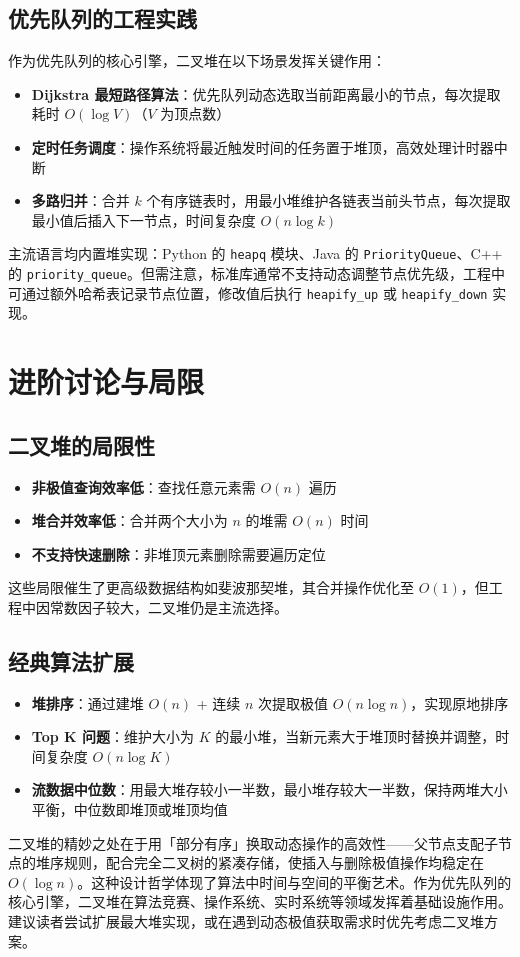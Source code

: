 \section{优先队列的工程实践}
作为优先队列的核心引擎，二叉堆在以下场景发挥关键作用：\par
\begin{itemize}
\item \textbf{Dijkstra 最短路径算法}：优先队列动态选取当前距离最小的节点，每次提取耗时 $O(\log V)$（$V$ 为顶点数）
\item \textbf{定时任务调度}：操作系统将最近触发时间的任务置于堆顶，高效处理计时器中断
\item \textbf{多路归并}：合并 $k$ 个有序链表时，用最小堆维护各链表当前头节点，每次提取最小值后插入下一节点，时间复杂度 $O(n \log k)$
\end{itemize}
主流语言均内置堆实现：Python 的 \texttt{heapq} 模块、Java 的 \texttt{PriorityQueue}、C++ 的 \texttt{priority\_{}queue}。但需注意，标准库通常不支持动态调整节点优先级，工程中可通过额外哈希表记录节点位置，修改值后执行 \texttt{heapify\_{}up} 或 \texttt{heapify\_{}down} 实现。\par
\chapter{进阶讨论与局限}
\section{二叉堆的局限性}
\begin{itemize}
\item \textbf{非极值查询效率低}：查找任意元素需 $O(n)$ 遍历
\item \textbf{堆合并效率低}：合并两个大小为 $n$ 的堆需 $O(n)$ 时间
\item \textbf{不支持快速删除}：非堆顶元素删除需要遍历定位
\end{itemize}
这些局限催生了更高级数据结构如斐波那契堆，其合并操作优化至 $O(1)$，但工程中因常数因子较大，二叉堆仍是主流选择。\par
\section{经典算法扩展}
\begin{itemize}
\item \textbf{堆排序}：通过建堆 $O(n)$ + 连续 $n$ 次提取极值 $O(n \log n)$，实现原地排序
\item \textbf{Top K 问题}：维护大小为 $K$ 的最小堆，当新元素大于堆顶时替换并调整，时间复杂度 $O(n \log K)$
\item \textbf{流数据中位数}：用最大堆存较小一半数，最小堆存较大一半数，保持两堆大小平衡，中位数即堆顶或堆顶均值
\end{itemize}
二叉堆的精妙之处在于用「部分有序」换取动态操作的高效性——父节点支配子节点的堆序规则，配合完全二叉树的紧凑存储，使插入与删除极值操作均稳定在 $O(\log n)$。这种设计哲学体现了算法中时间与空间的平衡艺术。作为优先队列的核心引擎，二叉堆在算法竞赛、操作系统、实时系统等领域发挥着基础设施作用。建议读者尝试扩展最大堆实现，或在遇到动态极值获取需求时优先考虑二叉堆方案。\par
